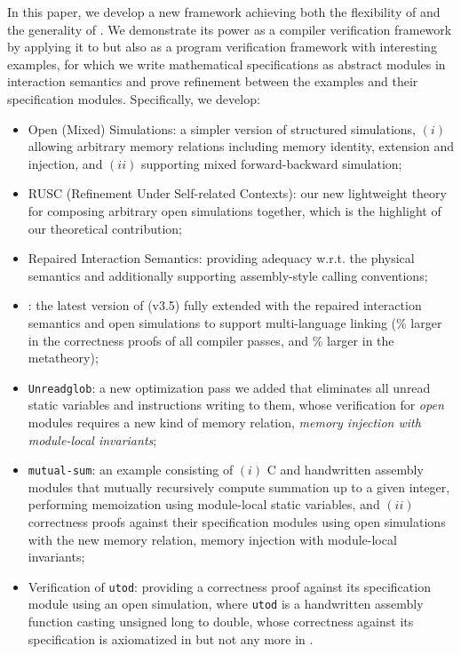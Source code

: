 %
In this paper, we develop a new framework achieving both the
flexibility of \ccx{} and the generality of \ccc{}.  We demonstrate
its power as a compiler verification framework by applying it to \cc{}
but also as a program verification framework with interesting
examples, for which we write mathematical specifications as abstract
modules in interaction semantics and prove refinement between the
examples and their specification modules.  Specifically, we develop:
\begin{itemize}
\item Open (Mixed) Simulations: a simpler version of structured simulations,
  $(i)$ allowing arbitrary memory relations including memory identity, extension and injection,
  and $(ii)$ supporting mixed forward-backward simulation;
\item RUSC (Refinement Under Self-related Contexts): our new
  lightweight theory for composing arbitrary open simulations
  together, which is the highlight of our theoretical contribution;
\item Repaired Interaction Semantics: providing adequacy w.r.t. the
  physical semantics and additionally supporting assembly-style
  calling conventions;
\item \ccm{}: the latest version of \cc{} (v3.5) fully extended with
  the repaired interaction semantics and open simulations to support
  multi-language linking (\% larger in the correctness
  proofs of all compiler passes, and \% larger in the metatheory);
\item \texttt{Unreadglob}:
  a new optimization pass we added that eliminates all unread static
  variables and instructions writing to them,
  whose verification for \emph{open} modules requires
  a new kind of memory relation, \emph{memory injection with module-local
  invariants};
\item \texttt{mutual-sum}: an example consisting of $(i)$ C and
  handwritten assembly modules that mutually recursively compute
  summation up to a given integer, performing memoization using
  module-local static variables, and $(ii)$ correctness proofs
  against their specification modules using open simulations with the
  new memory relation, memory injection with module-local invariants;
\item Verification of \texttt{utod}: providing a correctness proof
  against its specification module using an open simulation,
  where \texttt{utod} is a handwritten
  assembly function casting unsigned long to double, whose correctness
  against its specification is axiomatized in \cc{} but not any more
  in \ccm{}.
\end{itemize}
\medskip

